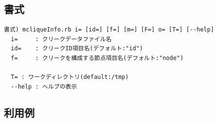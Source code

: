 \subsection{書式}
\begin{verbatim}
書式) mcliqueInfo.rb i= [id=] [f=] [m=] [F=] o= [T=] [--help]
  i=     : クリークデータファイル名
  id=    : クリークID項目名(デフォルト:"id")
  f=     : クリークを構成する節点項目名(デフォルト:"node")

  T= : ワークディレクトリ(default:/tmp)
  --help : ヘルプの表示
\end{verbatim}

\subsection{利用例}


